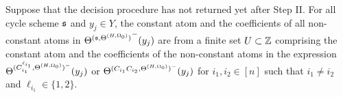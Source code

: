 \begin{lemma}\label{prop-bnd-domain-2}
	Suppose that the decision procedure has not returned yet after Step II. 
	For all cycle scheme ${\mathfrak{s} }$ and $y_j \in Y$, the constant atom and the coefficients of all non-constant atoms in ${\Theta^{({\mathfrak{s} }, \Theta^{(H,\Omega_0)})}}^-(y_j)$ are from a finite set $U \subset {\mathbb{Z} }$ comprising
the constant atom and the coefficients of the non-constant atoms in the expression $\Theta^{(C^{\ell_{i_1}}_{i_1}, \Theta^{(H, \Omega_0)})^-}(y_j)$ or $\Theta^{(C_{i_1}C_{i_2}, \Theta^{(H, \Omega_0)})^-}(y_j)$ for $i_1, i_2\in [n]$ such that $i_1 \neq i_2$ and $\ell_{i_1} \in \{1,2\}$.
%
\end{lemma}


